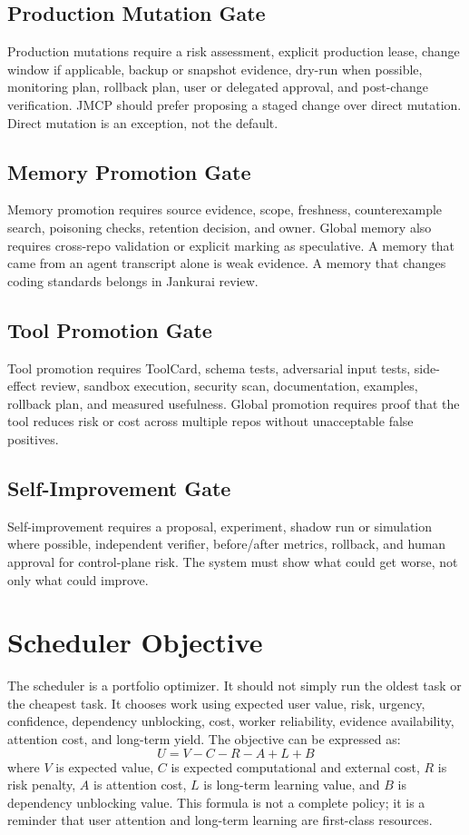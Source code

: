 \documentclass[10pt,journal,onecolumn]{IEEEtran}
\begin{document}
\subsection{Production Mutation Gate}
Production mutations require a risk assessment, explicit production lease, change window if applicable, backup or snapshot evidence, dry-run when possible, monitoring plan, rollback plan, user or delegated approval, and post-change verification. JMCP should prefer proposing a staged change over direct mutation. Direct mutation is an exception, not the default.

\subsection{Memory Promotion Gate}
Memory promotion requires source evidence, scope, freshness, counterexample search, poisoning checks, retention decision, and owner. Global memory also requires cross-repo validation or explicit marking as speculative. A memory that came from an agent transcript alone is weak evidence. A memory that changes coding standards belongs in Jankurai review.

\subsection{Tool Promotion Gate}
Tool promotion requires ToolCard, schema tests, adversarial input tests, side-effect review, sandbox execution, security scan, documentation, examples, rollback plan, and measured usefulness. Global promotion requires proof that the tool reduces risk or cost across multiple repos without unacceptable false positives.

\subsection{Self-Improvement Gate}
Self-improvement requires a proposal, experiment, shadow run or simulation where possible, independent verifier, before/after metrics, rollback, and human approval for control-plane risk. The system must show what could get worse, not only what could improve.

\section{Scheduler Objective}
The scheduler is a portfolio optimizer. It should not simply run the oldest task or the cheapest task. It chooses work using expected user value, risk, urgency, confidence, dependency unblocking, cost, worker reliability, evidence availability, attention cost, and long-term yield. The objective can be expressed as:
\[
U = V - C - R - A + L + B
\]
where $V$ is expected value, $C$ is expected computational and external cost, $R$ is risk penalty, $A$ is attention cost, $L$ is long-term learning value, and $B$ is dependency unblocking value. This formula is not a complete policy; it is a reminder that user attention and long-term learning are first-class resources.
\end{document}
